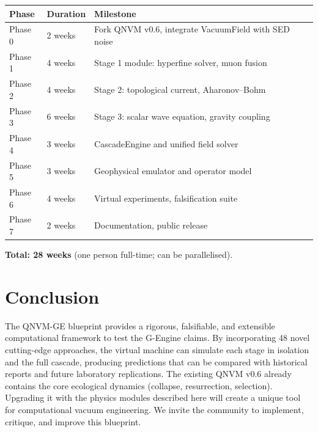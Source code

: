 \documentclass[11pt]{article}
\begin{document}
\begin{table}[h]
\centering
\begin{tabular}{lll}
\toprule
Phase & Duration & Milestone \\
\midrule
Phase 0 & 2 weeks & Fork QNVM v0.6, integrate VacuumField with SED noise \\
Phase 1 & 4 weeks & Stage 1 module: hyperfine solver, muon fusion \\
Phase 2 & 4 weeks & Stage 2: topological current, Aharonov--Bohm \\
Phase 3 & 6 weeks & Stage 3: scalar wave equation, gravity coupling \\
Phase 4 & 3 weeks & CascadeEngine and unified field solver \\
Phase 5 & 3 weeks & Geophysical emulator and operator model \\
Phase 6 & 4 weeks & Virtual experiments, falsification suite \\
Phase 7 & 2 weeks & Documentation, public release \\
\bottomrule
\end{tabular}
\end{table}

\textbf{Total: 28 weeks} (one person full-time; can be parallelised).

\section{Conclusion}

The QNVM-GE blueprint provides a rigorous, falsifiable, and extensible computational framework to test the G-Engine claims. By incorporating 48 novel cutting-edge approaches, the virtual machine can simulate each stage in isolation and the full cascade, producing predictions that can be compared with historical reports and future laboratory replications. The existing QNVM v0.6 already contains the core ecological dynamics (collapse, resurrection, selection). Upgrading it with the physics modules described here will create a unique tool for computational vacuum engineering. We invite the community to implement, critique, and improve this blueprint.
\end{document}
